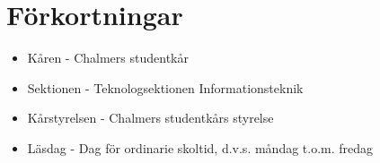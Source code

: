 \section{Förkortningar}
\begin{itemize}
	\item Kåren - Chalmers studentkår
	\item Sektionen - Teknologsektionen Informationsteknik
	\item Kårstyrelsen - Chalmers studentkårs styrelse
	\item Läsdag - Dag för ordinarie skoltid, d.v.s. måndag t.o.m. fredag
\end{itemize}